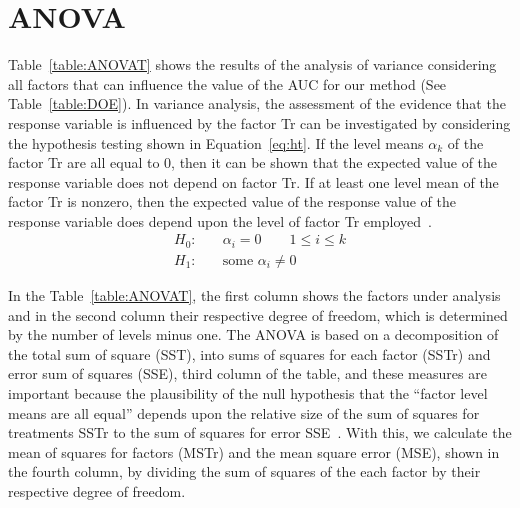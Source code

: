 \appendix
\section{ANOVA} 
\label{sec:appendix:anova}

Table~\ref{table:ANOVAT} shows the results of the analysis of variance considering all factors that can influence the value of the AUC for our method (See Table~\ref{table:DOE}). In variance analysis, the assessment of the evidence that the response variable is influenced by the factor {Tr} can be investigated by considering the hypothesis testing shown in Equation~\ref{eq:ht}. If the level means $\alpha_{k}$ of the factor {Tr} are all equal to $0$, then it can be shown that the expected value of the response variable does not depend on factor {Tr}. If at least one level mean of the factor {Tr} is nonzero, then the expected value of the response value of the response variable does depend upon the level of factor {Tr} employed~\cite{Hayter:CL:2012}.
\begin{equation}
\begin{aligned}
	H_{0}: & \quad \alpha_{i} = 0 \qquad 1 \leq i \leq k \\
	H_{1}: & \quad \text{some } \alpha_{i} \neq 0
\end{aligned}
\label{eq:ht}
\end{equation}

In the Table~\ref{table:ANOVAT}, the first column shows the factors under analysis and in the second column their respective degree of freedom, which is determined by the number of levels minus one. The ANOVA is based on a decomposition of the total sum of square (SST), into sums of squares for each factor (SSTr) and error sum of squares (SSE), third column of the table, and these measures are important because the plausibility of the null hypothesis that the ``factor level means are all equal'' depends upon the relative size of the sum of squares for treatments SSTr to the sum of squares for error SSE~\cite{Hayter:CL:2012}. With this, we calculate the mean of squares for factors (MSTr) and the mean square error (MSE), shown in the fourth column, by dividing the sum of squares of the each factor by their respective degree of freedom.

